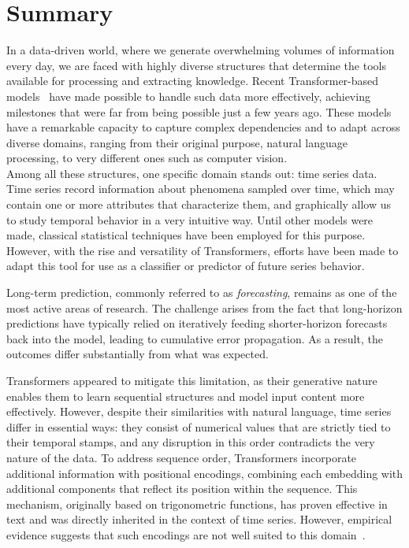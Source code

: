 %

\chapter{Summary}

In a data-driven world, where we generate overwhelming volumes of information every day, we are faced with highly diverse structures that determine the tools available for processing and extracting knowledge. Recent Transformer-based models~\cite{vaswani2023attentionneed} have made possible to handle such data more effectively, achieving milestones that were far from being possible just a few years ago. These models have a remarkable capacity to capture complex dependencies and to adapt across diverse domains, ranging from their original purpose, natural language processing, to very different ones such as computer vision.\\
Among all these structures, one specific domain stands out: time series data. Time series record information about phenomena sampled over time, which may contain one or more attributes that characterize them, and graphically allow us to study temporal behavior in a very intuitive way. Until other models were made, classical statistical techniques have been employed for this purpose. However, with the rise and versatility of Transformers, efforts have been made to adapt this tool for use as a classifier or predictor of future series behavior.\vspace{0.35em}

Long-term prediction, commonly referred to as \textit{forecasting}, remains as one of the most active areas of research. The challenge arises from the fact that long-horizon predictions have typically relied on iteratively feeding shorter-horizon forecasts back into the model, leading to cumulative error propagation. As a result, the outcomes differ substantially from what was expected.

Transformers appeared to mitigate this limitation, as their generative nature enables them to learn sequential structures and model input content more effectively. However, despite their similarities with natural language, time series differ in essential ways: they consist of numerical values that are strictly tied to their temporal stamps, and any disruption in this order contradicts the very nature of the data. 
To address sequence order, Transformers incorporate additional information with positional encodings, combining each embedding with additional components that reflect its position within the sequence. This mechanism, originally based on trigonometric functions, has proven effective in text and was directly inherited in the context of time series. However, empirical evidence suggests that such encodings are not well suited to this domain~\cite{zeng2022transformerseffectivetimeseries}.\vspace{0.35em}

